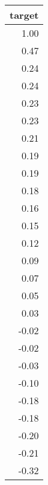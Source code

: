 \begin{tabular}{r}
\toprule
target \\
\midrule
1.00 \\
0.47 \\
0.24 \\
0.24 \\
0.23 \\
0.23 \\
0.21 \\
0.19 \\
0.19 \\
0.18 \\
0.16 \\
0.15 \\
0.12 \\
0.09 \\
0.07 \\
0.05 \\
0.03 \\
-0.02 \\
-0.02 \\
-0.03 \\
-0.10 \\
-0.18 \\
-0.18 \\
-0.20 \\
-0.21 \\
-0.32 \\
\bottomrule
\end{tabular}
